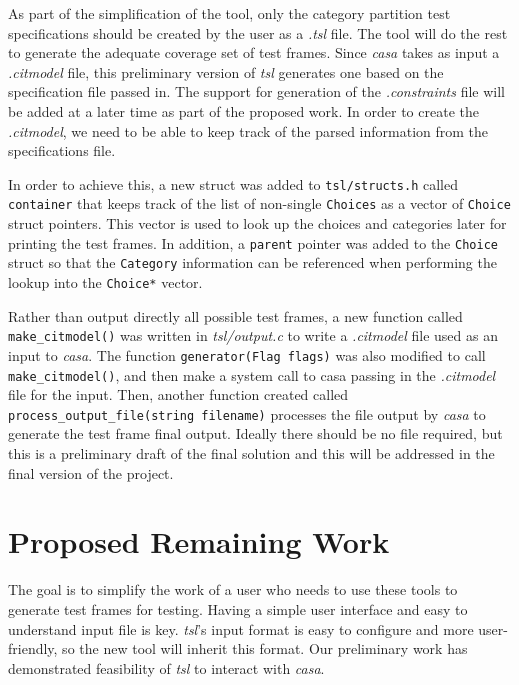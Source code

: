 \documentclass[a4full,12pt]{article}
\begin{document}
As part of the simplification of the tool, only the category partition test specifications
  should be created by the user as a \emph{.tsl} file. The tool will do the rest to
  generate the adequate coverage set of test frames. Since \emph{casa} takes as input a 
  \emph{.citmodel} file, this preliminary version of \emph{tsl} generates one based on the
  specification file passed in. The support for generation of the \emph{.constraints} file will be added
  at a later time as part of the proposed work. In order to create the \emph{.citmodel}, we need
  to be able to keep track of the parsed information from the specifications file.
  
In order to achieve this, a new struct was added to \texttt{tsl/structs.h} called \texttt{container} that
  keeps track of the list of non-single \texttt{Choices} as a vector of \texttt{Choice} struct
  pointers. This vector is used to look up the choices and categories later for
  printing the test frames. In addition, a \texttt{parent} pointer was added to
  the \texttt{Choice }struct so that the \texttt{Category} information can be referenced when
  performing the lookup into the \texttt{Choice*} vector.
  
Rather than output directly all possible test frames, a new function called
  \texttt{make\_citmodel()} was written in \emph{tsl/output.c} to write a 
  \emph{.citmodel} file used as an input to \emph{casa}. The function
\texttt{generator(Flag flags)} was also modified to call \texttt{make\_citmodel()},
  and then make a system call to casa passing in the \emph{.citmodel} file for
  the input. Then, another function created  called
\texttt{process\_output\_file(string filename)} processes the file output by
  \emph{casa} to generate the test frame final output. Ideally there should be
  no file required, but this is a preliminary draft of the final solution
  and this will be addressed in the final version of the project.
  
  \section{Proposed Remaining Work}
The goal is to simplify the work of a user who needs to use these tools to generate test frames
  for testing. Having a simple user interface and easy to understand input file is key. \emph{tsl}'s
  input format is easy to configure and more user-friendly, so the new tool will inherit this format.
  Our preliminary work has demonstrated feasibility of \emph{tsl} to interact with \emph{casa}.
  
\end{document}

